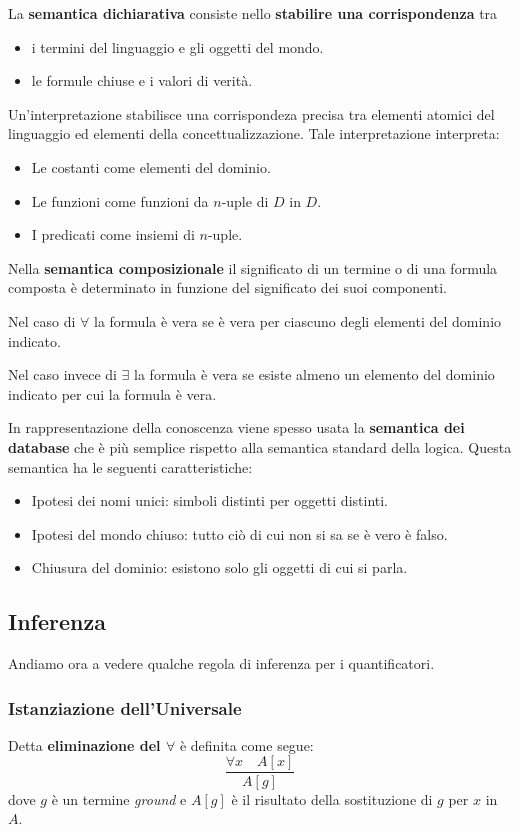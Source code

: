 La \textbf{semantica dichiarativa} consiste nello \textbf{stabilire una corrispondenza} tra
\begin{itemize}
	\item i termini del linguaggio e gli oggetti del mondo.
	\item le formule chiuse e i valori di verit\`a.
\end{itemize}
Un'interpretazione stabilisce una corrispondeza precisa tra elementi atomici del linguaggio ed elementi della
concettualizzazione. Tale interpretazione interpreta:
\begin{itemize}
	\item Le costanti come elementi del dominio.
	\item Le funzioni come funzioni da $n$-uple di $D$ in $D$.
	\item I predicati come insiemi di $n$-uple.
\end{itemize}

Nella \textbf{semantica composizionale} il significato di un termine o di una formula composta \`e determinato
in funzione del significato dei suoi componenti.

Nel caso di $\forall$ la formula \`e vera se \`e vera per ciascuno degli elementi del dominio indicato.

Nel caso invece di $\exists$ la formula \`e vera se esiste almeno un elemento del dominio indicato per cui la
formula \`e vera.

In rappresentazione della conoscenza viene spesso usata la \textbf{semantica dei database} che \`e pi\`u semplice
rispetto alla semantica standard della logica. Questa semantica ha le seguenti caratteristiche:
\begin{itemize}
	\item Ipotesi dei nomi unici: simboli distinti per oggetti distinti.
	\item Ipotesi del mondo chiuso: tutto ci\`o di cui non si sa se \`e vero \`e falso.
	\item Chiusura del dominio: esistono solo gli oggetti di cui si parla.
\end{itemize}

\subsection{Inferenza}
Andiamo ora a vedere qualche regola di inferenza per i quantificatori.
\subsubsection{Istanziazione dell'Universale}
Detta \textbf{eliminazione del $\forall$} \`e definita come segue:
\[ \frac{\forall x \quad A[x]}{A[g]} \]
dove $g$ \`e un termine \emph{ground} e $A[g]$ \`e il risultato della sostituzione di $g$ per $x$ in $A$.


